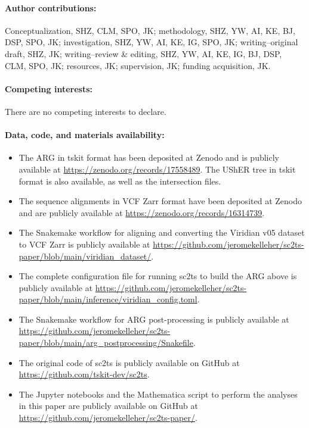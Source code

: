 \documentclass[12pt]{article}
\begin{document}
\paragraph*{Author contributions:}
Conceptualization, SHZ, CLM, SPO, JK;
methodology, SHZ, YW, AI, KE, BJ, DSP, SPO, JK;
investigation, SHZ, YW, AI, KE, IG, SPO, JK;
writing--original draft, SHZ, JK;
writing--review \& editing, SHZ, YW, AI, KE, IG, BJ, DSP, CLM, SPO, JK;
resources, JK;
supervision, JK;
funding acquisition, JK.

\paragraph*{Competing interests:}
There are no competing interests to declare.

\paragraph*{Data, code, and materials availability:}
\begin{itemize}
\item The ARG in tskit format has been deposited at Zenodo and is publicly
available at \url{https://zenodo.org/records/17558489}. The UShER tree
in tskit format is also available, as well as the intersection files.
\item The sequence alignments in VCF Zarr format have been deposited at
Zenodo and are publicly available at \url{https://zenodo.org/records/16314739}.
\item The Snakemake workflow for aligning and converting the Viridian v05 dataset to VCF Zarr is publicly available at \url{https://github.com/jeromekelleher/sc2ts-paper/blob/main/viridian\_dataset/}.
\item The complete configuration file for running sc2ts to build the ARG above is
publicly available at \url{https://github.com/jeromekelleher/sc2ts-paper/blob/main/inference/viridian\_config.toml}.
\item The Snakemake workflow for ARG post-processing is publicly
available at \url{https://github.com/jeromekelleher/sc2ts-paper/blob/main/arg_postprocessing/Snakefile}.
\item The original code of sc2ts is publicly available on
GitHub at \url{https://github.com/tskit-dev/sc2ts}.
\item The Jupyter notebooks and the Mathematica script to perform the analyses in this paper are publicly available on GitHub at \url{https://github.com/jeromekelleher/sc2ts-paper/}.
\end{itemize}
\end{document}

